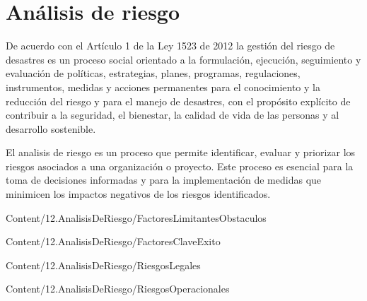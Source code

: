 \section{Análisis de riesgo}
De acuerdo con el Artículo 1 de la Ley 1523 de 2012 la gestión del riesgo de desastres es un proceso social orientado a la formulación, ejecución, seguimiento y evaluación de políticas, estrategias, planes, programas, regulaciones, instrumentos, medidas y acciones permanentes para el conocimiento y la reducción del riesgo y para el manejo de desastres, con el propósito explícito de contribuir a la seguridad, el bienestar, la calidad de vida de las personas y al desarrollo sostenible. 

El analisis de riesgo es un proceso que permite identificar, evaluar y priorizar los riesgos asociados a una organización o proyecto. Este proceso es esencial para la toma de decisiones informadas y para la implementación de medidas que minimicen los impactos negativos de los riesgos identificados.


{Content/12.AnalisisDeRiesgo/FactoresLimitantesObstaculos}

{Content/12.AnalisisDeRiesgo/FactoresClaveExito}

{Content/12.AnalisisDeRiesgo/RiesgosLegales}

{Content/12.AnalisisDeRiesgo/RiesgosOperacionales}
